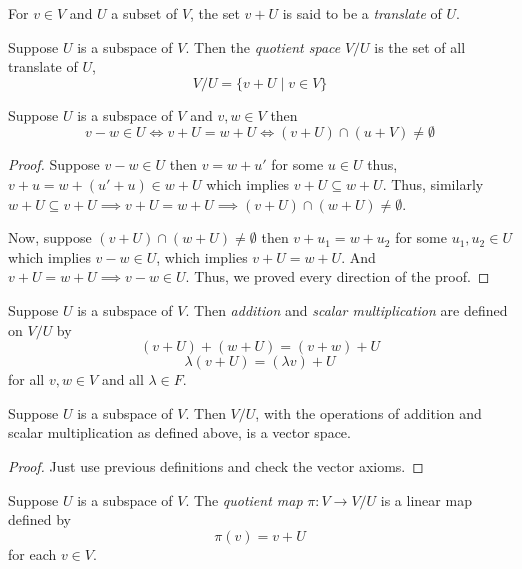 \begin{definition}
    For $v \in V$ and $U$ a subset of $V$, the set $v+U$ is said to be a \textit{translate} of $U$.
\end{definition}

\begin{definition}
    Suppose $U$ is a subspace of $V$. Then the \textit{quotient space} $V/U$ is the set of all translate of $U$,
    \[ V/U = \{ v+ U \mid v \in V \} \]
\end{definition}

\begin{proposition}
    Suppose $U$ is a subspace of $V$ and $v,w \in V$ then
    \[ v-w \in U \iff v+U = w + U \iff (v+U) \cap (u+V) \neq \emptyset \] 
\end{proposition}

\begin{proof}
    Suppose $v-w \in U$ then $v=w+u'$ for some $u \in U$ thus, $v+u = w+(u'+u) \in w + U$ which implies $v+U \subseteq w+U$.
    Thus, similarly $w+U \subseteq v+U \implies v+U = w+U \implies (v+U) \cap (w+U) \neq \emptyset$.

    Now, suppose $(v+U) \cap (w+U) \neq \emptyset$ then $v+u_1 = w+u_2$ for some $u_1,u_2 \in U$ which implies $v-w \in U$, which implies 
    $v+U=w+U$. And $v+U = w+U \implies v-w \in U$. Thus, we proved every direction of the proof.
\end{proof}

\begin{definition}
    Suppose $U$ is a subspace of $V$. Then \textit{addition} and \textit{scalar multiplication} are defined on $V/U$ by
    \[ (v+U)+(w+U) = (v+w)+U\]
    \[ \lambda(v+U) = (\lambda v) + U \]
    for all $v, w \in V$ and all $\lambda \in F$.
\end{definition}

\begin{proposition}
    Suppose $U$ is a subspace of $V$. Then $V/U$, with the operations of addition and scalar multiplication as defined above, is a vector
    space.
\end{proposition}

\begin{proof}
    Just use previous definitions and check the vector axioms. 
\end{proof}

\begin{proposition}
    Suppose $U$ is a subspace of $V$. The \textit{quotient map} $\pi : V \to V/U$ is a linear map defined by 
    \[ \pi(v) = v+U \]
    for each $v \in V$.
\end{proposition}

